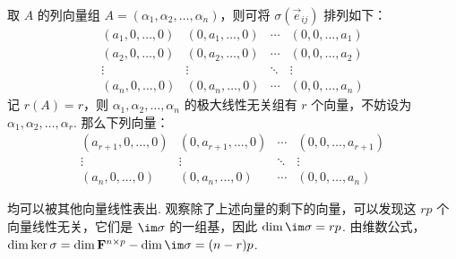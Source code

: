 \begin{exercise}
\begin{exgroup}
\begin{answer}
          取 $ A $ 的列向量组 $ A = (\alpha_1, \alpha_2, \ldots, \alpha_n) $，则可将 $ \sigma(\vec{e}_{ij}) $ 排列如下：
          \[ \begin{matrix}
                  (a_1, 0, \ldots, 0) & (0, a_1, \ldots, 0) & \cdots & (0, 0, \ldots, a_1) \\
                  (a_2, 0, \ldots, 0) & (0, a_2, \ldots, 0) & \cdots & (0, 0, \ldots, a_2) \\
                  \vdots              & \vdots              & \ddots & \vdots              \\
                  (a_n, 0, \ldots, 0) & (0, a_n, \ldots, 0) & \cdots & (0, 0, \ldots, a_n)
              \end{matrix} \]
          记 $ r(A) = r $，则 $ \alpha_1, \alpha_2, \ldots, \alpha_n $ 的极大线性无关组有 $ r $ 个向量，不妨设为 $ \alpha_1, \alpha_2, \ldots, \alpha_r $. 那么下列向量：
          \[ \begin{matrix}
                  (a_{r+1}, 0, \ldots, 0) & (0, a_{r+1}, \ldots, 0) & \cdots & (0, 0, \ldots, a_{r+1}) \\
                  \vdots                  & \vdots                  & \ddots & \vdots                  \\
                  (a_n, 0, \ldots, 0)     & (0, a_n, \ldots, 0)     & \cdots & (0, 0, \ldots, a_n)
              \end{matrix} \]

          均可以被其他向量线性表出. 观察除了上述向量的剩下的向量，可以发现这 $ rp $ 个向量线性无关，它们是 $ \im \sigma $ 的一组基，因此 $ \dim \im \sigma = rp $. 由维数公式，$ \dim \ker \sigma = \dim \mathbf{F}^{n \times p} - \dim \im \sigma = (n - r)p $.
        \end{answer}
    \end{exgroup}
\end{exercise}
